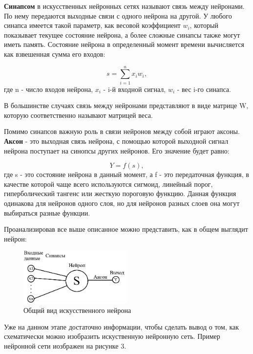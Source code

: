 \documentclass[bachelor, och, coursework]{shiza}
\begin{document}
\textbf{Синапсом} в искусственных нейронных сетях называют связь между нейронами. По нему передаются выходные связи с одного нейрона на 
другой. У любого синапса имеется такой параметр, как весовой коэффициент $w_i$, который показывает текущее состояние нейрона, а более сложные 
синапсы также могут иметь память. Состояние нейрона в определенный момент времени вычисляется как взвешенная сумма его входов:

\begin{equation}
    s = \sum\limits_{i=1}^nx_iw_i,
\end{equation}
где n - число входов нейрона, $x_i$ - i-й входной сигнал, $w_i$ - вес i-го синапса.

В большинстве случаях связь между нейронами представляют в виде матрице W, которую соответственно называют матрицей веса.

Помимо синапсов важную роль в связи нейронов между собой играют аксоны. \textbf{Аксон} - это выходная связь нейрона, с помощью которой выходной 
сигнал нейрона поступает на синопсы других нейронов. Его значение будет равно:

\begin{equation}
    Y = f(s),
\end{equation}
где s - это состояние нейрона в данный момент, а f - это передаточная функция, в качестве которой чаще всего используются сигмоид, линейный порог,
гиперболический тангенс или жесткую пороговую функцию. Данная функция одинакова для нейронов одного слоя, но для нейронов разных слоев она могут
выбираться разные функции.

Проанализировав все выше описанное можно представить, как в общем выглядит нейрон:

\begin{figure}[H]
    \centering
    \includegraphics[width=0.5\textwidth]{3}
    \caption{Общий вид искусственного нейрона}
    \label{fig:img1}
\end{figure}

Уже на данном этапе достаточно информации, чтобы сделать вывод о том, как схематически можно изобразить искуственную нейронную сеть. Пример нейронной 
сети иозбражен на рисунке 3.
\end{document}
